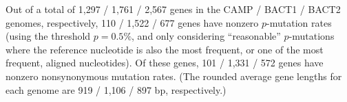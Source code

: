 Out of a total of 1,297 / 1,761 / 2,567 genes in the CAMP / BACT1 / BACT2 genomes, respectively, 110 / 1,522 / 677 genes have nonzero $p$-mutation rates (using the threshold $p=0.5\%$, and only considering ``reasonable'' $p$-mutations where the reference nucleotide is also the most frequent, or one of the most frequent, aligned nucleotides). Of these genes, 101 / 1,331 / 572 genes have nonzero nonsynonymous mutation rates. (The rounded average gene lengths for each genome are 919 / 1,106 / 897 bp, respectively.)\endinput